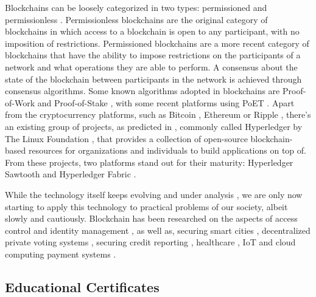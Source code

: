 Blockchains can be loosely categorized in two types: permissioned and permissionless \cite{pilkington_blockchain_2016, yaga_blockchain_2018}. Permissionless blockchains are the original category of blockchains in which access to a blockchain is open to any participant, with no imposition of restrictions. Permissioned blockchains are a more recent category of blockchains that have the ability to impose restrictions on the participants of a network and what operations they are able to perform. A consensus about the state of the blockchain between participants in the network is achieved through consensus algorithms. Some known algorithms adopted in blockchains are Proof-of-Work \cite{nakamoto_bitcoin:_2008} and Proof-of-Stake \cite{king_ppcoin:_2012}, with some recent platforms using PoET \cite{intel_poet}. Apart from the cryptocurrency platforms, such as Bitcoin  \cite{nakamoto_bitcoin:_2008}, Ethereum \cite{buterin_next-generation_2013} or Ripple \cite{schwartz_ripple_2014}, there's an existing group of projects, as predicted in \cite{buterin_next-generation_2013}, commonly called Hyperledger by The Linux Foundation \cite{linuxfoundation}, that provides a collection of open-source blockchain-based resources for organizations and individuals to build applications on top of. From these projects, two platforms stand out for their maturity: Hyperledger Sawtooth \cite{hyperledger_sawtooth} and Hyperledger Fabric \cite{hyperledger_fabric}.

While the technology itself keeps evolving and under analysis \cite{eyal_bitcoin-ng:_2016, lin_survey_2017, narayanan_bitcoins_2017}, we are only now starting to apply this technology to practical problems of our society, albeit slowly and cautiously. Blockchain has been researched on the aspects of access control \cite{maesa_blockchain_2017} and identity management \cite{augot_identity_2017, yasin_online_2016}, as well as, securing smart cities \cite{biswas_securing_2016}, decentralized private voting systems \cite{sheer_hardwick_e-voting_2018}, securing credit reporting \cite{kafshdar_goharshady_secure_2018}, healthcare \cite{azaria_medrec:_2016}, IoT \cite{christidis_blockchains_2016, ouaddah_access_2017, dorri_blockchain_2017, ouaddah_fairaccess:_2017} and cloud computing payment systems \cite{zhang_blockchain_2018}.

\subsection{Educational Certificates}
\label{sec:related-ec}

